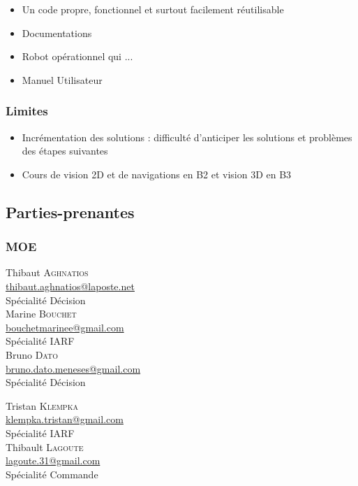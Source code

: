 \documentclass[10pt,a4paper]{article}
\begin{document}
\begin{itemize}
\renewcommand{\labelitemi}{$\square$}
\item Un code propre, fonctionnel et surtout facilement réutilisable 
\item Documentations
\item Robot opérationnel qui ...
\item Manuel Utilisateur
\end{itemize} 

\subsubsection{Limites}
\begin{itemize}
\item Incrémentation des solutions : difficulté d'anticiper les solutions et problèmes des étapes suivantes
\item Cours de vision 2D et de navigations en B2 et vision 3D en B3
\end{itemize} 

\subsection{Parties-prenantes}

\subsubsection{MOE} 
\begin{minipage}[t]{0.30 \textwidth} 
Thibaut \textsc{Aghnatios} \\
\href{mailto:thibaut.aghnatios@laposte.net}{thibaut.aghnatios@laposte.net} \\
Spécialité Décision \\[0.3cm]
Marine \textsc{Bouchet} \\
\href{mailto:bouchetmarinee@gmail.com}{bouchetmarinee@gmail.com} \\
Spécialité IARF \\[0.3cm]
Bruno \textsc{Dato} \\
\href{mailto:bruno.dato.meneses@gmail.com}{bruno.dato.meneses@gmail.com} \\
Spécialité Décision
\end{minipage} 
\hfill
\begin{minipage}[t]{0.46\textwidth} 
Tristan \textsc{Klempka} \\
\href{mailto:klempka.tristan@gmail.com}{klempka.tristan@gmail.com} \\
Spécialité IARF \\[0.3cm]
Thibault \textsc{Lagoute} \\
\href{mailto:lagoute.31@gmail.com}{lagoute.31@gmail.com}   \\
Spécialité Commande
\end{minipage} 
\end{document}
